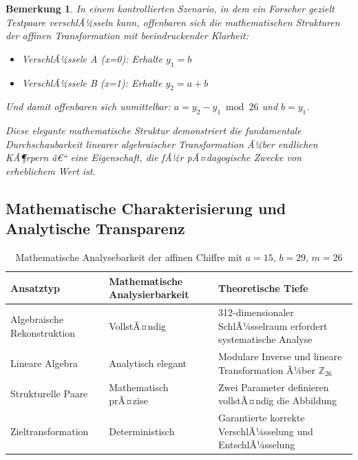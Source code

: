 ﻿\documentclass[12pt,a4paper]{article}
\newtheorem{remark}{Bemerkung}
\begin{document}
	\begin{remark}
		In einem kontrollierten Szenario, in dem ein Forscher gezielt Testpaare verschlÃ¼sseln kann, offenbaren sich die mathematischen Strukturen der affinen Transformation mit beeindruckender Klarheit:
		\begin{itemize}
			\item VerschlÃ¼ssele A (x=0): Erhalte $y_1 = b$
			\item VerschlÃ¼ssele B (x=1): Erhalte $y_2 = a + b$
		\end{itemize}
		
		Und damit offenbaren sich unmittelbar: $a = y_2 - y_1 \bmod 26$ und $b = y_1$.
		
		Diese elegante mathematische Struktur demonstriert die fundamentale Durchschaubarkeit linearer algebraischer Transformation Ã¼ber endlichen KÃ¶rpern â€“ eine Eigenschaft, die fÃ¼r pÃ¤dagogische Zwecke von erheblichem Wert ist.
	\end{remark}
	
	\subsection{Mathematische Charakterisierung und Analytische Transparenz}
	
	\begin{table}
		\caption{Mathematische Analysebarkeit der affinen Chiffre mit $a=15$, $b=29$, $m=26$}
		\begin{tabular}{|l|l|p{7cm}|}
			\hline
			\textbf{Ansatztyp} & \textbf{Mathematische Analysierbarkeit} & \textbf{Theoretische Tiefe} \\
			\hline\hline
			Algebraische Rekonstruktion & VollstÃ¤ndig & 312-dimensionaler SchlÃ¼sselraum erfordert systematische Analyse \\
			\hline
			Lineare Algebra & Analytisch elegant & Modulare Inverse und lineare Transformation Ã¼ber $\mathbb{Z}_{26}$ \\
			\hline
			Strukturelle Paare & Mathematisch prÃ¤zise & Zwei Parameter definieren vollstÃ¤ndig die Abbildung \\
			\hline
			Zieltransformation & Deterministisch & Garantierte korrekte VerschlÃ¼sselung und EntschlÃ¼sselung \\
			\hline
		\end{tabular}
	\end{table}
	
\end{document}
